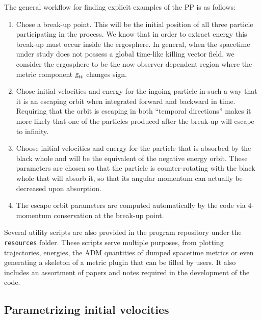 %
The general workflow for finding explicit examples of the PP is as follows:
%
\begin{enumerate}
  \item Chose a break-up point. This will be the initial position of all three particle participating in the process. We know that in order to extract energy this break-up must occur inside the ergosphere. In general, when the spacetime under study does not possess a global time-like killing vector field, we consider the ergosphere to be the now observer dependent region where the metric component $\mtrtens{t}{t}$ changes sign.
  \item Chose initial velocities and energy for the ingoing particle in such a way that it is an escaping orbit when integrated forward and backward in time. Requiring that the orbit is escaping in both ``temporal directions'' makes it more likely that one of the particles produced after the break-up will escape to infinity.
  \item Choose initial velocities and energy for the particle that is absorbed by the black whole and will be the equivalent of the negative energy orbit. These parameters are chosen so that the particle is counter-rotating with the black whole that will absorb it, so that its angular momentum can actually be decreased upon absorption.
  \item The escape orbit parameters are computed automatically by the code via 4-momentum conservation at the break-up point.
\end{enumerate}
%
Several utility scripts are also provided in the program repository under the \texttt{resources} folder. These scripts serve multiple purposes, from plotting trajectories, energies, the ADM quantities of dumped spacetime metrics or even generating a skeleton of a metric plugin that can be filled by users. It also includes an assortment of papers and notes required in the development of the code.

\subsection{Parametrizing initial velocities}

